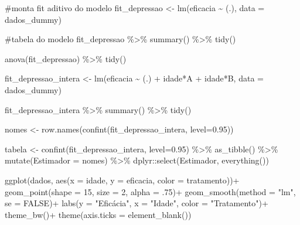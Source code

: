\documentclass[
  letterpaper,
  DIV=11,
  numbers=noendperiod]{scrartcl}
\newenvironment{Shaded}{\begin{snugshade}}{\end{snugshade}}
\newcommand{\AttributeTok}[1]{\textcolor[rgb]{0.40,0.45,0.13}{#1}}
\newcommand{\CommentTok}[1]{\textcolor[rgb]{0.37,0.37,0.37}{#1}}
\newcommand{\ConstantTok}[1]{\textcolor[rgb]{0.56,0.35,0.01}{#1}}
\newcommand{\DecValTok}[1]{\textcolor[rgb]{0.68,0.00,0.00}{#1}}
\newcommand{\FloatTok}[1]{\textcolor[rgb]{0.68,0.00,0.00}{#1}}
\newcommand{\FunctionTok}[1]{\textcolor[rgb]{0.28,0.35,0.67}{#1}}
\newcommand{\NormalTok}[1]{\textcolor[rgb]{0.00,0.23,0.31}{#1}}
\newcommand{\OtherTok}[1]{\textcolor[rgb]{0.00,0.23,0.31}{#1}}
\newcommand{\SpecialCharTok}[1]{\textcolor[rgb]{0.37,0.37,0.37}{#1}}
\newcommand{\StringTok}[1]{\textcolor[rgb]{0.13,0.47,0.30}{#1}}
\begin{document}
\begin{Shaded}
\begin{Highlighting}[]
\CommentTok{\#monta fit aditivo do modelo}
\NormalTok{fit\_depressao }\OtherTok{\textless{}{-}} \FunctionTok{lm}\NormalTok{(eficacia }\SpecialCharTok{\textasciitilde{}}\NormalTok{ (.), }\AttributeTok{data =}\NormalTok{ dados\_dummy)}

\CommentTok{\#tabela do modelo}
\NormalTok{fit\_depressao }\SpecialCharTok{\%\textgreater{}\%}
  \FunctionTok{summary}\NormalTok{() }\SpecialCharTok{\%\textgreater{}\%} 
  \FunctionTok{tidy}\NormalTok{()}

\FunctionTok{anova}\NormalTok{(fit\_depressao) }\SpecialCharTok{\%\textgreater{}\%}
  \FunctionTok{tidy}\NormalTok{()}

\NormalTok{fit\_depressao\_intera }\OtherTok{\textless{}{-}} \FunctionTok{lm}\NormalTok{(eficacia }\SpecialCharTok{\textasciitilde{}}\NormalTok{ (.) }\SpecialCharTok{+}\NormalTok{ idade}\SpecialCharTok{*}\NormalTok{A }\SpecialCharTok{+}\NormalTok{ idade}\SpecialCharTok{*}\NormalTok{B, }\AttributeTok{data =}\NormalTok{ dados\_dummy)}

\NormalTok{fit\_depressao\_intera }\SpecialCharTok{\%\textgreater{}\%}
  \FunctionTok{summary}\NormalTok{() }\SpecialCharTok{\%\textgreater{}\%} 
  \FunctionTok{tidy}\NormalTok{()}

\NormalTok{nomes }\OtherTok{\textless{}{-}} \FunctionTok{row.names}\NormalTok{(}\FunctionTok{confint}\NormalTok{(fit\_depressao\_intera, }\AttributeTok{level=}\FloatTok{0.95}\NormalTok{))}

\NormalTok{tabela }\OtherTok{\textless{}{-}} \FunctionTok{confint}\NormalTok{(fit\_depressao\_intera, }\AttributeTok{level=}\FloatTok{0.95}\NormalTok{) }\SpecialCharTok{\%\textgreater{}\%} 
  \FunctionTok{as\_tibble}\NormalTok{() }\SpecialCharTok{\%\textgreater{}\%}
  \FunctionTok{mutate}\NormalTok{(}\AttributeTok{Estimador =}\NormalTok{ nomes) }\SpecialCharTok{\%\textgreater{}\%}
\NormalTok{  dplyr}\SpecialCharTok{::}\FunctionTok{select}\NormalTok{(Estimador, }\FunctionTok{everything}\NormalTok{()) }

\FunctionTok{ggplot}\NormalTok{(dados, }\FunctionTok{aes}\NormalTok{(}\AttributeTok{x =}\NormalTok{ idade, }\AttributeTok{y =}\NormalTok{ eficacia, }\AttributeTok{color =}\NormalTok{ tratamento))}\SpecialCharTok{+}
  \FunctionTok{geom\_point}\NormalTok{(}\AttributeTok{shape =} \DecValTok{15}\NormalTok{, }\AttributeTok{size =} \DecValTok{2}\NormalTok{, }\AttributeTok{alpha =}\NormalTok{ .}\DecValTok{75}\NormalTok{)}\SpecialCharTok{+}
  \FunctionTok{geom\_smooth}\NormalTok{(}\AttributeTok{method =} \StringTok{"lm"}\NormalTok{, }\AttributeTok{se =} \ConstantTok{FALSE}\NormalTok{)}\SpecialCharTok{+}
  \FunctionTok{labs}\NormalTok{(}\AttributeTok{y =} \StringTok{"Eficácia"}\NormalTok{, }\AttributeTok{x =} \StringTok{"Idade"}\NormalTok{, }\AttributeTok{color =} \StringTok{"Tratamento"}\NormalTok{)}\SpecialCharTok{+}
  \FunctionTok{theme\_bw}\NormalTok{()}\SpecialCharTok{+}
  \FunctionTok{theme}\NormalTok{(}\AttributeTok{axis.ticks =} \FunctionTok{element\_blank}\NormalTok{())}


\end{Highlighting}
\end{Shaded}
\end{document}
